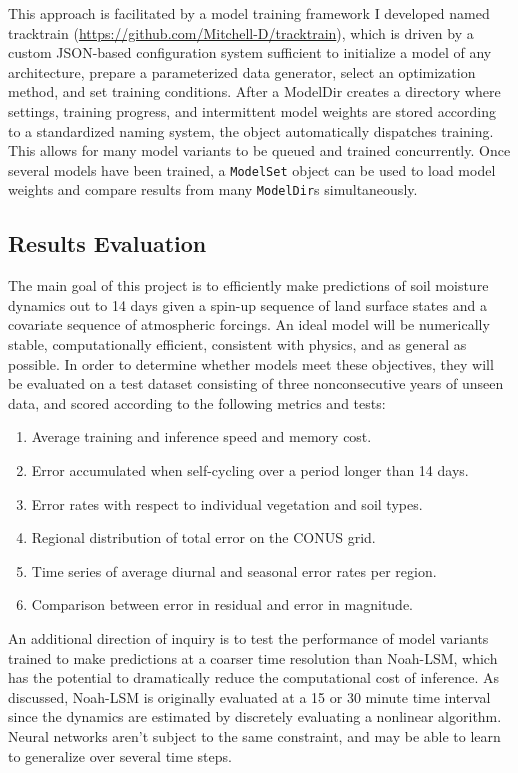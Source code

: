 \documentclass[11pt]{article}
\begin{document}
\begin{multicols}{2}
    This approach is facilitated by a model training framework I developed named tracktrain (\url{https://github.com/Mitchell-D/tracktrain}), which is driven by a custom JSON-based configuration system sufficient to initialize a model of any architecture, prepare a parameterized data generator, select an optimization method, and set training conditions. After a ModelDir creates a directory where settings, training progress, and intermittent model weights are stored according to a standardized naming system, the object automatically dispatches training.  This allows for many model variants to be queued and trained concurrently. Once several models have been trained, a \texttt{ModelSet} object can be used to load model weights and compare results from many \texttt{ModelDir}s simultaneously.

    \subsection{Results Evaluation}

    The main goal of this project is to efficiently make predictions of soil moisture dynamics out to 14 days given a spin-up sequence of land surface states and a covariate sequence of atmospheric forcings. An ideal model will be numerically stable, computationally efficient, consistent with physics, and as general as possible. In order to determine whether models meet these objectives, they will be evaluated on a test dataset consisting of three nonconsecutive years of unseen data, and scored according to the following metrics and tests:

    \begin{enumerate}
        \item Average training and inference speed and memory cost.
        \item Error accumulated when self-cycling over a period longer than 14 days.
        \item Error rates with respect to individual vegetation and soil types.
        \item Regional distribution of total error on the CONUS grid.
        \item Time series of average diurnal and seasonal error rates per region.
        \item Comparison between error in residual and error in magnitude.
    \end{enumerate}

    An additional direction of inquiry is to test the performance of model variants trained to make predictions at a coarser time resolution than Noah-LSM, which has the potential to dramatically reduce the computational cost of inference. As discussed, Noah-LSM  is originally evaluated at a 15 or 30 minute time interval since the dynamics are estimated by discretely evaluating a nonlinear algorithm. Neural networks aren't subject to the same constraint, and may be able to learn to generalize over several time steps.

\end{multicols}
\end{document}
